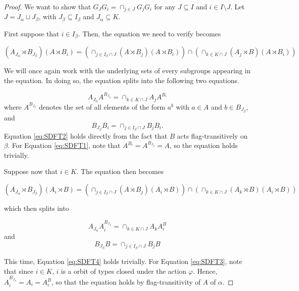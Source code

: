 \documentclass[11pt,letterpaper]{amsart}
\begin{document}
\begin{proof}
    We want to show that $G_JG_i = \cap_{j\in J} G_j G_i$ for any $J \subseteq I$ and $i\in I\setminus J$. Let $J = J_\alpha \sqcup J_\beta$, with $J_\beta \subseteq I_\beta$ and $J_\alpha \subseteq K$.
    
    First suppose that $i \in I_\beta$. Then, the equation we need to verify becomes

    $$ (A_{J_\alpha} \rtimes B_{J_\beta}) (A \rtimes B_i) = (\cap_{j \in I_\beta \cap J} (A \rtimes B_j) (A \rtimes B_i)) \cap ( \cap_{k \in K \cap J} (A_j \rtimes B) (A \rtimes B_i)) $$

    We will once again work with the underlying sets of every subgroups appearing in the equation. In doing so, the equation splits into the following two equations.
    
    \begin{equation}\label{eq:SDFT1}
          A_{J_\alpha} A^{B_{J_\beta}} =  \cap_{k \in K \cap J} A_j A^{B_i}
    \end{equation}
    where $A^{B_{J_\beta}}$ denotes the set of all elements of the form $a^{b}$ with $a \in A$ and $b \in B_{J_\beta}$,
    and 
  \begin{equation}\label{eq:SDFT2}
      B_{J_\beta}B_i = \cap_{j\in I_\beta \cap J} B_j B_i.
  \end{equation}
    Equation \ref{eq:SDFT2} holds directly from the fact that $B$ acts flag-transitively on $\beta$. For Equation \ref{eq:SDFT1}, note that $A^{B_i} = A^{B_{J_\beta}} = A$, so the equation holds trivially.

    Suppose now that $i \in K$. The equation then becomes

        $$ (A_{J_\alpha} \rtimes B_{J_\beta}) (A_i \rtimes B) = (\cap_{j \in I_\beta \cap J} (A \rtimes B_j) (A_i \rtimes B) )\cap (\cap_{k \in K \cap J} (A_k \rtimes B) (A_i \rtimes B))$$


which then splits into

\begin{equation}\label{eq:SDFT3}
          A_{J_\alpha} A_i^{B_{J_\beta}} =  \cap_{k \in K \cap J} A_k A_i^{B}
    \end{equation}
    and 
  \begin{equation}\label{eq:SDFT4}
      B_{J_\beta}B = \cap_{j\in I_\beta \cap J} B_j B
  \end{equation}

  This time, Equation \ref{eq:SDFT4} holds trivially. For Equation \ref{eq:SDFT3}, note that since $i\in K$, $i$ is a orbit of types closed under the action $\varphi$. Hence, $A_i^{B_{J_\beta}} = A_i =A_i^B$, so that the equation holds by flag-transitivity of $A$ of $\alpha$.

\end{proof}
\end{document}
